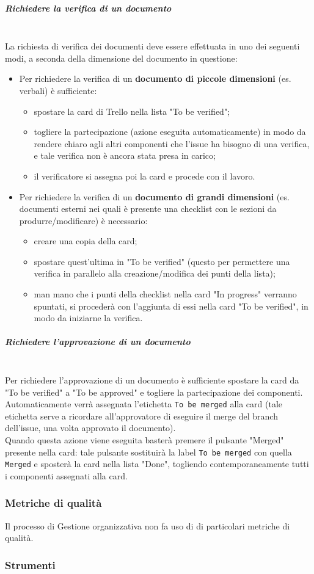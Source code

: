 \subparagraph{Richiedere la verifica di un documento}
\mbox{}\\
\indent La richiesta di verifica dei documenti deve essere effettuata in uno dei seguenti modi, 
\indent a seconda della dimensione del documento in questione:
\begin{itemize}
    \item Per richiedere la verifica di un \textbf{documento di piccole dimensioni} (es. verbali) è sufficiente:
    \begin{itemize}
        \item spostare la card di Trello nella lista "To be verified"; 
        \item togliere la partecipazione (azione eseguita automaticamente) in modo da rendere chiaro agli altri 
        componenti che l'issue ha bisogno di una verifica, e tale verifica non è ancora stata presa in carico;
        \item il verificatore si assegna poi la card e procede con il lavoro.
    \end{itemize}
    \item Per richiedere la verifica di un \textbf{documento di grandi dimensioni} (es. documenti esterni nei quali è presente 
    una checklist con le sezioni da produrre/modificare) è necessario:
    \begin{itemize}
        \item creare una copia della card;
        \item spostare quest'ultima in "To be verified" (questo per permettere una verifica in parallelo alla 
        creazione/modifica dei punti della lista);
        \item man mano che i punti della checklist nella card "In progress" verranno spuntati, si procederà con 
        l'aggiunta di essi nella card "To be verified", in modo da iniziarne la verifica.
    \end{itemize}
\end{itemize}

\subparagraph{Richiedere l'approvazione di un documento}
\mbox{}\\
Per richiedere l'approvazione di un documento è sufficiente spostare la card da "To be verified" a "To be approved" 
e togliere la partecipazione dei componenti.\\ 
Automaticamente verrà assegnata l'etichetta \texttt{To be merged} alla card (tale etichetta serve a ricordare all'approvatore 
di eseguire il merge del branch dell'issue, una volta approvato il documento).\\
Quando questa azione viene eseguita basterà premere il pulsante "Merged" presente nella card: tale pulsante sostituirà la label 
\texttt{To be merged} con quella \texttt{Merged} e sposterà la card nella lista "Done", togliendo contemporaneamente tutti i 
componenti assegnati alla card.

\subsubsection{Metriche di qualità}
Il processo di Gestione organizzativa non fa uso di di particolari metriche di qualità.

\subsubsection{Strumenti}